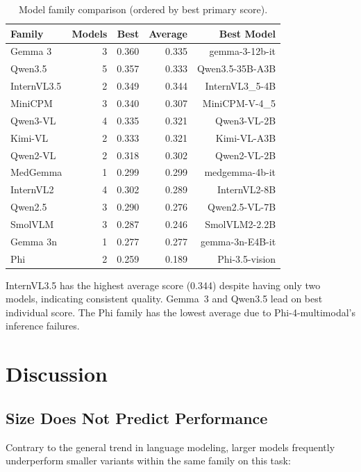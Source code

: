 \documentclass[11pt,a4paper]{article}
\begin{document}
\begin{table}[H]
\centering
\caption{Model family comparison (ordered by best primary score).}
\label{tab:families_results}
\begin{tabular}{lrrrr}
\toprule
\textbf{Family} & \textbf{Models} & \textbf{Best} & \textbf{Average} & \textbf{Best Model} \\
\midrule
Gemma 3 & 3 & 0.360 & 0.335 & gemma-3-12b-it \\
Qwen3.5 & 5 & 0.357 & 0.333 & Qwen3.5-35B-A3B \\
InternVL3.5 & 2 & 0.349 & 0.344 & InternVL3\_5-4B \\
MiniCPM & 3 & 0.340 & 0.307 & MiniCPM-V-4\_5 \\
Qwen3-VL & 4 & 0.335 & 0.321 & Qwen3-VL-2B \\
Kimi-VL & 2 & 0.333 & 0.321 & Kimi-VL-A3B \\
Qwen2-VL & 2 & 0.318 & 0.302 & Qwen2-VL-2B \\
MedGemma & 1 & 0.299 & 0.299 & medgemma-4b-it \\
InternVL2 & 4 & 0.302 & 0.289 & InternVL2-8B \\
Qwen2.5 & 3 & 0.290 & 0.276 & Qwen2.5-VL-7B \\
SmolVLM & 3 & 0.287 & 0.246 & SmolVLM2-2.2B \\
Gemma 3n & 1 & 0.277 & 0.277 & gemma-3n-E4B-it \\
Phi & 2 & 0.259 & 0.189 & Phi-3.5-vision \\
\bottomrule
\end{tabular}
\end{table}

InternVL3.5 has the highest average score (0.344) despite having only two models, indicating consistent quality. Gemma~3 and Qwen3.5 lead on best individual score. The Phi family has the lowest average due to Phi-4-multimodal's inference failures.

\section{Discussion}

\subsection{Size Does Not Predict Performance}

Contrary to the general trend in language modeling, larger models frequently underperform smaller variants within the same family on this task:
\end{document}

